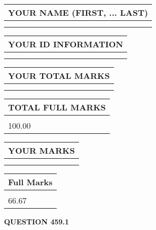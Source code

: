 \documentclass{ctexart}
\begin{document}
   
   
   
\newpage 
\setcounter{page}{ 
   459001 } 
   
   
   
   
\noindent\begin{tabular}{|l|}
\hline
YOUR NAME (FIRST, ... LAST)  \\
\hline
 \\ 
 \\ 
\hline
\end{tabular}
\hspace{0.05in} \begin{tabular}{|l|}
\hline
 YOUR   ID   INFORMATION  \\
\hline
 \\ 
 \\ 
\hline
\end{tabular}
   
   
\vspace{0.2in}\noindent\begin{tabular}{|l|}
\hline
YOUR TOTAL MARKS  \\
\hline
 \\ 
 \\ 
\hline
\end{tabular}
\hspace{0.05in} \begin{tabular}{|l|}
\hline
TOTAL FULL MARKS  \\
\hline
 \\ 
100.00 \\
\hline
\end{tabular}
   
   
 \vspace{0.2in}
 
 
 
 
   
   
  
\vspace{0.2in}
  
\noindent\begin{tabular}{|l|}
\hline
 YOUR MARKS  \\
\hline
 \\ 
 \\ 
\hline
\end{tabular}
\hspace{0.05in} \begin{tabular}{|l|}
\hline
 Full Marks  \\
\hline
 \\ 
66.67 \\
\hline
\end{tabular}
{\textbf{\Large{QUESTION
459.1 
}}}
  
\end{document}
